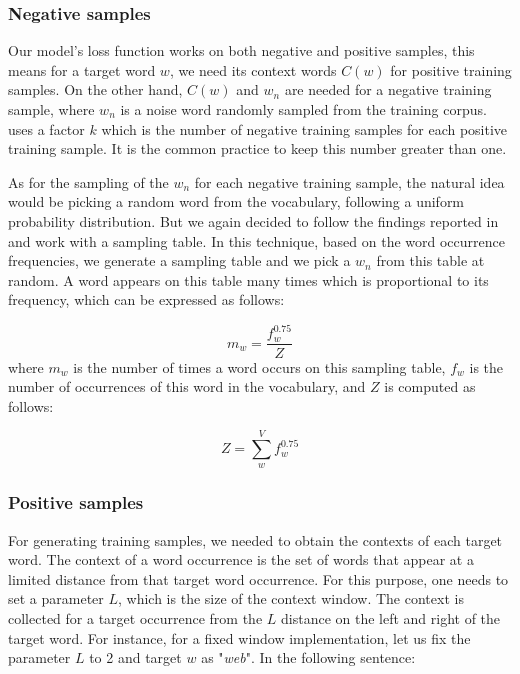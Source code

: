 

\subsubsection{Negative samples} 

Our model's loss function works on both negative and positive samples, this means for a target word $w$, we need its context words $C(w)$ for positive training samples. On the other hand, $C(w)$ and $w_n$ are needed for a negative training sample, where $w_n$ is a noise word randomly sampled from the training corpus. \cite{w2v2} uses a factor $k$ which is the number of negative training samples for each positive training sample. It is the common practice to keep this number greater than one. 

As for the sampling of the $w_n$ for each negative training sample, the natural idea would be picking a random word from the vocabulary, following a uniform probability distribution. But we again decided to follow the findings reported in \cite{w2v2} and work with a sampling table. In this technique, based on the word occurrence frequencies, we generate a sampling table and we pick a $w_n$ from this table at random. A word appears on this table many times which is proportional to its frequency, which can be expressed as follows: 

\[m_w = \frac{f_w^{0.75}}{Z}\]
\noindent
where $m_w$ is the number of times a word occurs on this sampling table, $f_w$ is the number of occurrences of this word in the vocabulary, and $Z$ is computed as follows:

\[Z = \sum_{w}^{V} f_w^{0.75}\]

\subsubsection{Positive samples}

For generating training samples, we needed to obtain the contexts of each target word. The context of a word occurrence is the set of words that appear at a limited distance from that target word occurrence. For this purpose, one needs to set a parameter $L$, which is the size of the context window. The context is collected for a target occurrence from the $L$ distance on the left and right of the target word. For instance, for a fixed window implementation, let us fix the parameter $L$ to 2 and target $w$ as "\textit{web}". In the following sentence:

